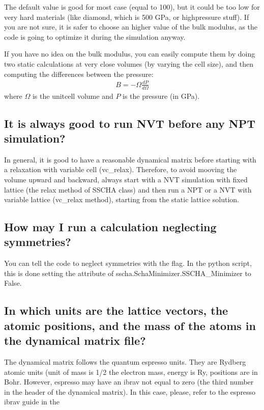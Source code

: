 \documentclass[a4paper,11pt,english]{sphinxmanual}
\begin{document}
\sphinxAtStartPar
The default value is good for most case (equal to 100), but it could be too low for very hard materials (like diamond, which is 500 GPa, or high\sphinxhyphen{}pressure stuff). If you are not sure, it is safer to choose an higher value of the bulk modulus, as the code is going to optimize it during the simulation anyway.

\sphinxAtStartPar
If you have no idea on the bulk modulus, you can easily compute them by doing two static  calculations at very close volumes (by varying the cell size), and then computing the differences between the pressure:
\begin{equation*}
\begin{split}B = - \Omega \frac{dP}{d\Omega}\end{split}
\end{equation*}
\sphinxAtStartPar
where \(\Omega\) is the unit\sphinxhyphen{}cell volume and \(P\) is the pressure (in GPa).


\subsection{It is always good to run NVT before any NPT simulation?}
\label{\detokenize{faq:it-is-always-good-to-run-nvt-before-any-npt-simulation}}
\sphinxAtStartPar
In general, it is good to have a reasonable dynamical matrix before starting with a relaxation with variable cell (vc\_relax).
Therefore, to avoid mooving the volume upward and backward, always start with a NVT simulation with fixed lattice (the relax method of SSCHA class) and then run a NPT or a NVT with variable lattice (vc\_relax method), starting from the static lattice solution.


\subsection{How may I run a calculation neglecting symmetries?}
\label{\detokenize{faq:how-may-i-run-a-calculation-neglecting-symmetries}}
\sphinxAtStartPar
You can tell the code to neglect symmetries with the  flag.
In the python script, this is done setting the attribute  of sscha.SchaMinimizer.SSCHA\_Minimizer to False.


\subsection{In which units are the lattice vectors, the atomic positions, and the mass of the atoms in the dynamical matrix file?}
\label{\detokenize{faq:in-which-units-are-the-lattice-vectors-the-atomic-positions-and-the-mass-of-the-atoms-in-the-dynamical-matrix-file}}
\sphinxAtStartPar
The dynamical matrix follows the quantum espresso units. They are Rydberg atomic units (unit of mass is 1/2  the electron mass, energy is Ry, positions are in Bohr. However, espresso may have an ibrav not equal to zero (the third number in the header of the dynamical matrix). In this case, please, refer to the espresso ibrav guide in the 
\end{document}
